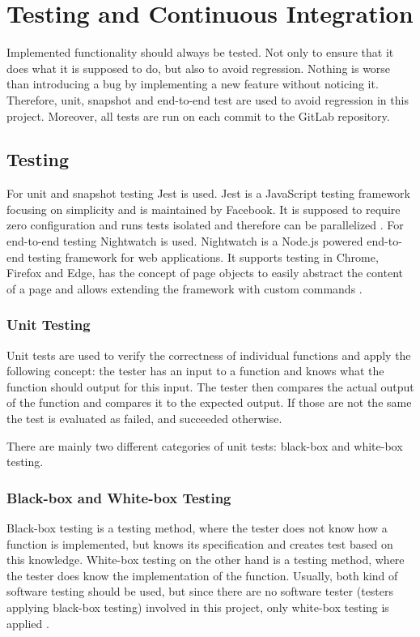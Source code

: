 \chapter{Testing and Continuous Integration}
\label{chapter:testingAndCI}

Implemented functionality should always be tested. Not only to ensure that it does what it is supposed to do, but also to avoid regression. Nothing is worse than introducing a bug by implementing a new feature without noticing it. Therefore, unit, snapshot and end-to-end test are used to avoid regression in this project.
Moreover, all tests are run on each commit to the GitLab repository.

\section{Testing}
\label{section:testing}
For unit and snapshot testing Jest is used. Jest is a JavaScript testing framework focusing on simplicity and is maintained by Facebook. It is supposed to require zero configuration and runs tests isolated and therefore can be parallelized \cite{Jest}. For end-to-end testing Nightwatch is used. Nightwatch is a Node.js powered end-to-end testing framework for web applications. It supports testing in Chrome, Firefox and Edge, has the concept of page objects to easily abstract the content of a page and allows extending the framework with custom commands \cite{Nightwatch}.

\subsection{Unit Testing}
\label{subsection:unitTesting}
Unit tests are used to verify the correctness of individual functions and apply the following concept: the tester has an input to a function and knows what the function should output for this input. The tester then compares the actual output of the function and compares it to the expected output. If those are not the same the test is evaluated as failed, and succeeded otherwise.

There are mainly two different categories of unit tests: black-box and white-box testing.

\subsection*{Black-box and White-box Testing}
Black-box testing is a testing method, where the tester does not know how a function is implemented, but knows its specification and creates test based on this knowledge. White-box testing on the other hand is a testing method, where the tester does know the implementation of the function. Usually, both kind of software testing should be used, but since there are no software tester (testers applying black-box testing) involved in this project, only white-box testing is applied \cite{BlackBoxWhiteBoxTesting}.

